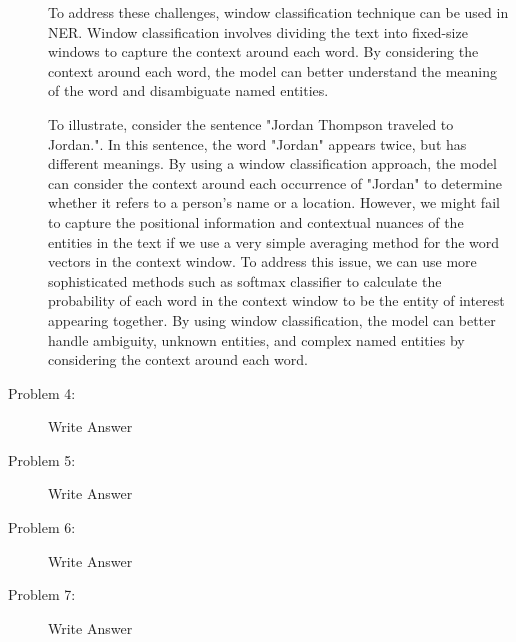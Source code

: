 \documentclass[12pt]{article}
\begin{document}
\begin{description}
  To address these challenges, window classification technique can be used in NER. Window classification involves dividing the text into fixed-size windows
  to capture the context around each word. By considering the context around each word, the model can better understand the meaning of the word and disambiguate named entities.

  To illustrate, consider the sentence "Jordan Thompson traveled to Jordan.". In this sentence, the word "Jordan" appears twice, but has different meanings.
  By using a window classification approach, the model can consider the context around each occurrence of "Jordan" to determine whether it refers to a person's name or a location.
  However, we might fail to capture the positional information and contextual nuances of the entities in the text if we use a very simple averaging method for the word vectors in the context window.
  To address this issue, we can use more sophisticated methods such as softmax classifier to calculate the probability of each word in the context window to be the entity of interest appearing together.
  By using window classification, the model can better handle ambiguity, unknown entities, and complex named entities by considering the context around each word.

  \pagebreak

  \item[Problem 4:] \hfill %
  
  Write Answer

  \pagebreak

  \item[Problem 5:] \hfill %
  
  Write Answer

  \pagebreak

  \item[Problem 6:] \hfill %
  
  Write Answer

  \pagebreak

  \item[Problem 7:] \hfill %
  
  Write Answer


\end{description}
\end{document}
